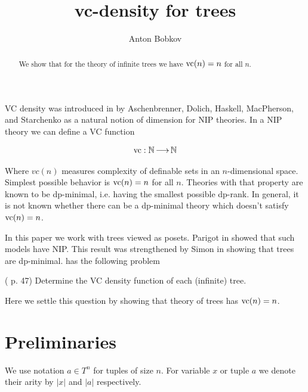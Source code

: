 \documentclass{amsart}
\begin{document}
\title{vc-density for trees}
\author{Anton Bobkov}

\begin{abstract}
	We show that for the theory of infinite trees we have $\operatorname{vc}(n) = n$ for all $n$.
\end{abstract}

\maketitle

VC density was introduced in \cite{vc_density} by Aschenbrenner, Dolich, Haskell, MacPherson, and Starchenko as a natural notion of dimension for NIP theories. In a NIP theory we can define a VC function

\begin{align*}
	\operatorname{vc} : \mathbb{N} \operatorname{\longrightarrow} \mathbb{N}
\end{align*}

Where $vc(n)$ measures complexity of definable sets in an $n$-dimensional space. Simplest possible behavior is $\operatorname{vc}(n) = n$ for all $n$. Theories with that property are known to be dp-minimal, i.e. having the smallest possible dp-rank. In general, it is not known whether there can be a dp-minimal theory which doesn't satisfy $\operatorname{vc}(n)=n$.

In this paper we work with trees viewed as posets. Parigot in \cite{parigot_trees} showed that such models have NIP. This result was strengthened by Simon in \cite{simon_dp_min} showing that trees are dp-minimal. \cite{vc_density} has the following problem 

\begin{Problem} (\cite{vc_density} p. 47)
	Determine the VC density function of each (infinite) tree.
\end{Problem}

Here we settle this question by showing that theory of trees has $\operatorname{vc}(n) = n$.

\section{Preliminaries}
We use notation $a \in T^n$ for tuples of size $n$. For variable $x$ or tuple $a$ we denote their arity by $|x|$ and $|a|$ respectively.
\end{document}
